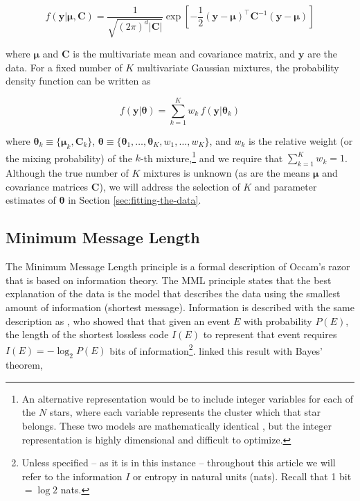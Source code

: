 \documentclass{aastex61}
\newcommand{\vect}[1]{\boldsymbol{\mathbf{#1}}}
\def\veccov{\vect{C}}
\def\vecmean{\vect{\mu}}
\def\vectheta{\vect{\theta}}
\def\weight{w}
\def\datum{y}
\def\data{\vect{\datum}}
\begin{document}
\begin{equation}
  f(\data|\vecmean,\veccov) 
      = \frac{1}{\sqrt{(2\pi)^d|\veccov|}}
        \exp{\left[-\frac{1}{2}(\data - \vecmean)^\intercal\veccov^{-1}(\data - \vecmean)\right]}
\end{equation}

\noindent{}where $\vecmean$ and $\veccov$ is the multivariate mean and 
covariance matrix, and $\data$ are the data.
For a fixed number of $K$ multivariate Gaussian mixtures, the probability
density function can be written as

\begin{equation}
  f(\data|\vectheta) = \sum_{k=1}^{K} \weight_k \, f(\data|\vectheta_k)
\end{equation}

\noindent{}where $\vectheta_k \equiv \{\vecmean_k, \veccov_k\}$,
$\vectheta \equiv \{\vectheta_1,\dots,\vectheta_K,\weight_1,\dots,\weight_K\}$, and
$\weight_k$ is the relative weight (or the mixing probability) of the $k$-th 
mixture,\footnote{
  An alternative representation would be to include integer variables for each
  of the $N$ stars, where each variable represents the cluster which that star
  belongs.
  These two models are mathematically identical \citep[e.g., see discussion in][]{Foreman_Mackey_2014},
  but the integer representation is highly dimensional and difficult to
  optimize.}
and we require that $\sum_{k=1}^{K} \weight_k = 1$.
Although the true number of $K$ mixtures is unknown (as are the means $\vecmean$
and covariance matrices $\veccov$), we will address the selection of $K$
and parameter estimates of $\vectheta$ in Section \ref{sec:fitting-the-data}.


\subsection{Minimum Message Length}
\label{sec:mml}

The Minimum Message Length \citep[MML;][]{Wallace_1968} principle is a formal
description of Occam's razor that is based on information theory.
The MML principle states that the best explanation of the data is the model
that describes the data using the smallest amount of information (shortest
message).
Information is described with the same description as \citet{Shannon_1948},
who showed that that given an event $E$ with probability $P(E)$, the length of 
the shortest lossless code $I(E)$ to represent that event requires 
$I(E) = -\log_{2}P(E)$ bits of information\footnote{
  Unless specified -- as it is in this instance -- throughout this article we 
  will refer to the information $I$ or entropy in natural units (nats). 
  Recall that 1 bit $= \log{2}$ nats.
  }.
\citet{Wallace_1968} linked this result with Bayes' theorem, 
\end{document}
